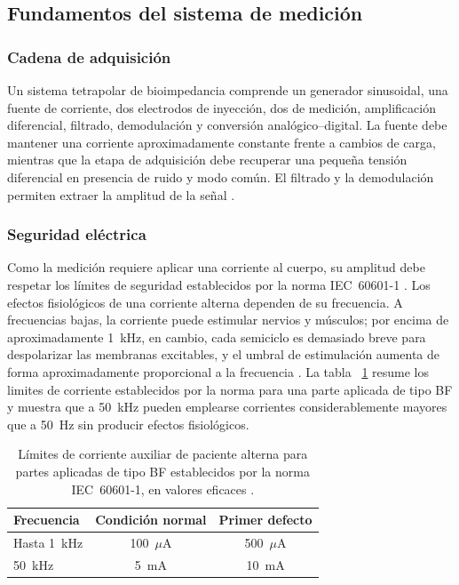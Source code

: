 \documentclass[12pt,a4paper]{article}
\begin{document}
\subsection{Fundamentos del sistema de medición}

\subsubsection{Cadena de adquisición}

Un sistema tetrapolar de bioimpedancia comprende un generador sinusoidal, una fuente de corriente, dos
electrodos de inyección, dos de medición, amplificación diferencial, filtrado, demodulación y conversión
analógico--digital. La fuente debe mantener una corriente aproximadamente constante frente a cambios de
carga, mientras que la etapa de adquisición debe recuperar una pequeña tensión diferencial en presencia
de ruido y modo común. El filtrado y la demodulación permiten extraer la amplitud de la señal \cite{alrawi2013howland}.

\subsubsection{Seguridad eléctrica}

Como la medición requiere aplicar una corriente al cuerpo, su amplitud debe respetar los límites de
seguridad establecidos por la norma IEC~60601-1 \cite{iec60601}. Los efectos fisiológicos de una
corriente alterna dependen de su frecuencia. A frecuencias bajas, la corriente puede estimular nervios
y músculos; por encima de aproximadamente 1~kHz, en cambio, cada semiciclo es demasiado breve para
despolarizar las membranas excitables, y el umbral de estimulación aumenta de forma aproximadamente
proporcional a la frecuencia \cite{webster2010medical,grimnes2015bioimpedance}. La tabla ~\ref{tab:limites_iec} 
resume los limites de corriente establecidos por la norma para una parte aplicada de tipo BF y muestra que a
50~kHz pueden emplearse corrientes considerablemente mayores que a 50~Hz sin
producir efectos fisiológicos.

\begin{table}[htbp]
    \centering
    \caption{Límites de corriente auxiliar de paciente alterna para partes aplicadas de tipo BF
    establecidos por la norma IEC~60601-1, en valores eficaces \cite{iec60601}.}
    \label{tab:limites_iec}
    \begin{tabular}{lcc}
        \hline
        Frecuencia & Condición normal & Primer defecto \\
        \hline
        Hasta 1~kHz & 100~$\mu$A & 500~$\mu$A \\
        50~kHz & 5~mA & 10~mA \\
        \hline
    \end{tabular}
\end{table}
\end{document}
